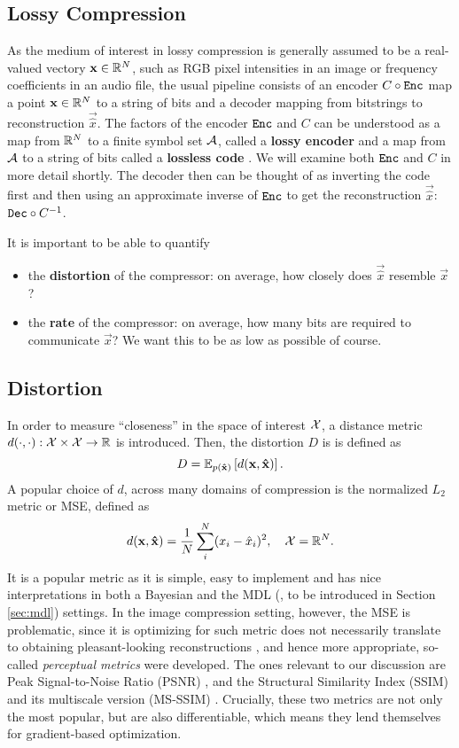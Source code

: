 \subsection{Lossy Compression}
As the medium of interest in lossy compression is generally assumed to be a
real-valued vectory $\vec{x} \in \Reals^N$, such as RGB pixel intensities in an
image or frequency coefficients in an audio file, the usual pipeline consists of 
an encoder $C \circ \Enc$ map a point $\vec{x} \in \Reals^N$ to a string of bits and a
decoder mapping from bitstrings to reconstruction $\vec{\hat{x}}$. The
factors of the encoder $\Enc$ and $C$ can be understood as a map from $\Reals^N$ to a
finite symbol set $\A$, called a \textbf{lossy encoder} and a map from $\A$ to a
string of bits called a \textbf{lossless code} \cite{goyal2001theoretical}.
We will examine both $\Enc$ and $C$ in more detail shortly. The decoder then can be
thought of as inverting the code first and then using an approximate inverse of
$\Enc$ to get the reconstruction $\vec{\hat{x}}$: $\Dec \circ C^{-1}$.
\par
It is important to be able to quantify
\begin{itemize}
\item the \textbf{distortion} of the compressor: on average, how closely does
  $\vec{\hat{x}}$ resemble $\vec{x}$?
\item the \textbf{rate} of the compressor: on average, how many bits are
  required to communicate $\vec{x}$? We want this to be as low as possible of course.
\end{itemize}

\subsection{Distortion}
In order to measure ``closeness'' in the space of interest $\ImSpace$,
a distance metric $d(\cdot, \cdot): \ImSpace
\times \ImSpace \rightarrow \Reals$ is introduced. Then, the distortion $D$ is 
is defined as
\[
  D = \Exp{d(\vec{x}, \vec{\hat{x}})}{p(\vec{\hat{x}})}.
\]
A popular choice of $d$, across many domains of compression is the normalized $L_2$ metric
or MSE, defined as
\[
  d(\vec{x}, \vec{\hat{x}}) = \frac{1}{N} \sum_{i}^N (x_i - \hat{x}_i)^2, \quad
  \ImSpace = \Reals^N.
\]
It is a popular metric as it is simple, easy to implement and has nice
interpretations in both a Bayesian \cite{bishop2013pattern} and the MDL
(\cite{hinton1993keeping}, to be introduced in Section \ref{sec:mdl}) settings.
In the image compression setting, however, the MSE is problematic, since it is
optimizing for such metric does not necessarily translate to obtaining pleasant-looking
reconstructions \cite{zhao2015loss}, and hence more appropriate, so-called \textit{perceptual
  metrics} were developed. The ones relevant to our discussion are Peak
Signal-to-Noise Ratio (PSNR) \cite{psnr}, \cite{gupta2011modified} and the
Structural Similarity Index (SSIM) \cite{wang2004image} and its multiscale
version (MS-SSIM) \cite{msssim}. Crucially, these
two metrics are not only the most popular, but are also differentiable, which
means they lend themselves for gradient-based optimization.

